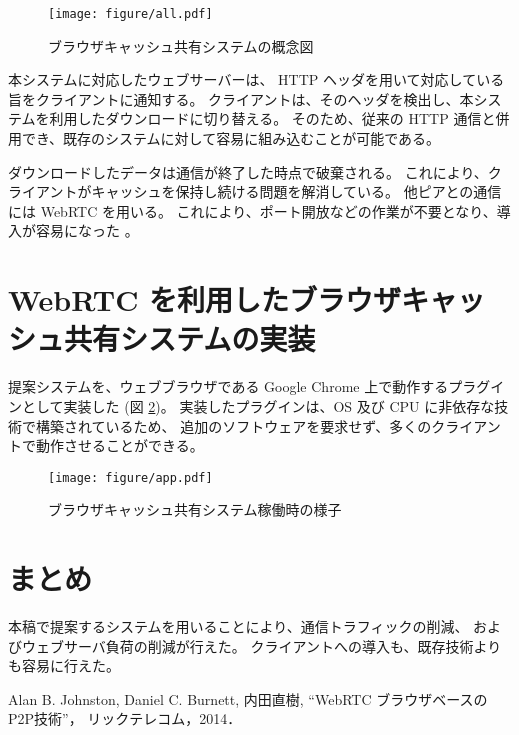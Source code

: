 \documentclass[a4j]{jarticle}
\begin{document}
\begin{Abstract}
  \begin{figure}[!t]
    \centering
    \texttt{[image: figure/all.pdf]}
    \caption{ブラウザキャッシュ共有システムの概念図}
    \label{fig:all}
  \end{figure}
  
  本システムに対応したウェブサーバーは、
  HTTP ヘッダを用いて対応している旨をクライアントに通知する。
  クライアントは、そのヘッダを検出し、本システムを利用したダウンロードに切り替える。
  そのため、従来の HTTP 通信と併用でき、既存のシステムに対して容易に組み込むことが可能である。
  
  ダウンロードしたデータは通信が終了した時点で破棄される。
  これにより、クライアントがキャッシュを保持し続ける問題を解消している。
  他ピアとの通信には WebRTC を用いる。
  これにより、ポート開放などの作業が不要となり、導入が容易になった \cite{bib:webrtc}。
  
  \section{WebRTC を利用したブラウザキャッシュ共有システムの実装}
  提案システムを、ウェブブラウザである Google Chrome 上で動作するプラグインとして実装した (図 \ref{fig:impl})。
  実装したプラグインは、OS 及び CPU に非依存な技術で構築されているため、
  追加のソフトウェアを要求せず、多くのクライアントで動作させることができる。
  
  \begin{figure}[!t]
    \centering
    \texttt{[image: figure/app.pdf]}
    \caption{ブラウザキャッシュ共有システム稼働時の様子}
    \label{fig:impl}
  \end{figure}
  
  \section{まとめ}
  本稿で提案するシステムを用いることにより、通信トラフィックの削減、
  およびウェブサーバ負荷の削減が行えた。
  クライアントへの導入も、既存技術よりも容易に行えた。

\begin{thebibliography}{99}
   Alan B. Johnston, Daniel C. Burnett, 内田直樹, 
    ``WebRTC ブラウザベースのP2P技術''，
    リックテレコム，2014．
\end{thebibliography}

\end{Abstract}
\end{document}
